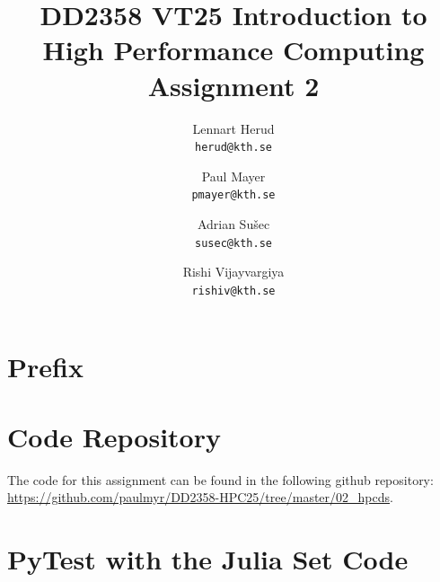 \documentclass[a4paper,12pt]{article}
\title{
  \normalsize{DD2358 VT25 Introduction to}\\
  \normalsize{High Performance Computing}\\
  \large{Assignment 2}\\
}
\author{
  \small Lennart Herud\\[-0.75ex]
  \scriptsize\texttt{herud@kth.se}
  \and
    \small Paul Mayer\\[-0.75ex]
  \scriptsize\texttt{pmayer@kth.se}
  \and
    \small Adrian Sušec\\[-0.75ex]
  \scriptsize\texttt{susec@kth.se}
  \and
  \small Rishi Vijayvargiya\\[-0.75ex]
  \scriptsize\texttt{rishiv@kth.se}
}
\date{}
\begin{document}
\maketitle
\thispagestyle{firstpagestyle}

\listoftodos

\vspace{1em}

%
\section*{Prefix}

%

\section*{Code Repository}
The code for this assignment can be found in the following github repository:
\url{https://github.com/paulmyr/DD2358-HPC25/tree/master/02_hpcds}.
\section{PyTest with the Julia Set Code}
\end{document}
